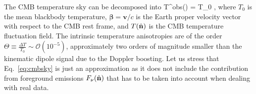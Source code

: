 The \gls{CMB} temperature sky can be decomposed into 
%
\be
\label{eq:cmbsky}
T^{\rm obs}(\nver) = T_0 , 
\ee
% 
where $T_0$ is the mean blackbody temperature, $\bm{\beta} = \bm{v}/c$ is the Earth proper velocity 
vector with respect to the \gls{CMB} rest frame, and $T(\hat{\mathbf{n}})$ is the \gls{CMB} temperature fluctuation field. 
The intrinsic temperature anisotropies are of the order $\Theta\equiv  \frac{\Delta T}{T_0} 
\sim \mathcal{O}(10^{-5})$,
approximately two orders of magnitude smaller than the kinematic dipole signal due to the Doppler 
boosting. Let us stress that Eq.~\eqref{eq:cmbsky} is just an approximation as it does not include the 
contribution from 
foreground emissions $F_{\nu}(\hat{\mathbf{n}})$ that has to be taken into account when dealing with real data. 

